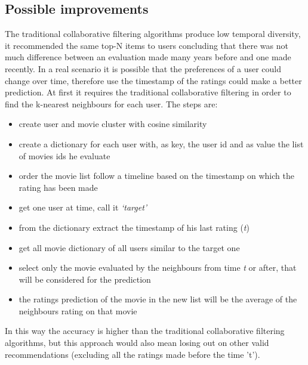 \documentclass{article}
\begin{document}
\subsection{Possible improvements}
The traditional collaborative filtering algorithms produce low temporal diversity, it recommended the same top-N items to users concluding that there was not much difference between an evaluation made many years before and one made recently. In a real scenario it is possible that the preferences of a user could change over time, therefore use the timestamp of the ratings could make a better prediction. At first it requires the traditional collaborative filtering in order to find the k-nearest neighbours for each user. The steps are:
\begin{itemize}
      \item create user and movie cluster with cosine similarity
      \item create a dictionary for each user with, as key, the user id and as value the list of movies ids he evaluate
      \item order the movie list follow a timeline based on the timestamp on which the rating has been made
      \item get one user at time, call it \textsl{‘target’}
      \item from the dictionary extract the timestamp of his last rating (\textsl{t})
      \item get all movie dictionary of all users similar to the target one
      \item select only the movie evaluated by the neighbours from time \textsl{t} or after, that will be considered for the prediction
      \item the ratings prediction of the movie in the new list will be the average of the neighbours rating on that movie
\end{itemize}
In this way the accuracy is higher than the traditional collaborative filtering algorithms, but this approach would also mean losing out on other valid recommendations (excluding all the ratings made before the time ’t’).
\end{document}
